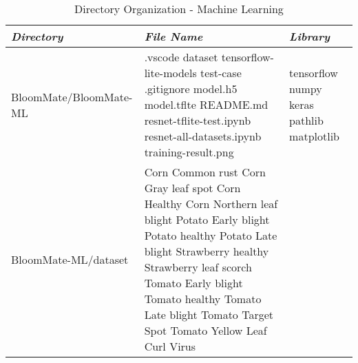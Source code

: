 \documentclass[conference, a4paper]{IEEEtran}
\begin{document}
\begin{table} [htp]
    \caption{Directory Organization - Machine Learning}
    \centering
    \renewcommand{\arraystretch}{1.3}
    \begin{tabular}{p{1.7cm}|p{2.8cm}|p{2.5cm}}
    \hline
    \textit{\textbf{Directory}} & \textit{\textbf{File Name}} & \textit{\textbf{Library}} \\
     \hline
BloomMate\newline /BloomMate-ML & .vscode \newline dataset \newline tensorflow-lite-models \newline test-case \newline .gitignore \newline model.h5 \newline model.tflte \newline README.md \newline resnet-tflite-test.ipynb \newline resnet-all-datasets.ipynb \newline training-result.png & tensorflow \newline
numpy \newline keras \newline pathlib \newline matplotlib \\
\hline
BloomMate-ML\newline/dataset & Corn Common rust \newline Corn Gray leaf spot \newline Corn Healthy \newline Corn Northern leaf blight \newline Potato Early blight \newline Potato healthy \newline Potato Late blight \newline Strawberry healthy \newline Strawberry leaf scorch \newline Tomato Early blight
 \newline Tomato healthy \newline Tomato Late blight \newline Tomato Target Spot \newline Tomato Yellow Leaf Curl Virus & \\
 \hline
    \end{tabular}
\end{table}
\newpage
\end{document}
